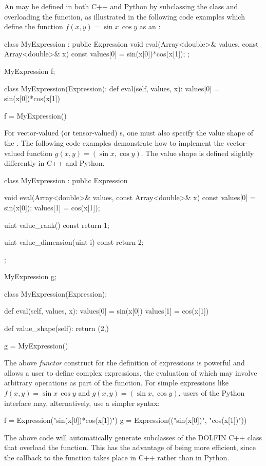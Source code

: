 An  may be defined in both C++ and Python by
subclassing the  class and overloading the 
function, as illustrated in the following code examples which define
the function $f(x, y) = \sin x \, \cos y$ as an :
\begin{c++}
class MyExpression : public Expression
{
  void eval(Array<double>& values, const Array<double>& x) const
  {
    values[0] = sin(x[0])*cos(x[1]);
  }
};

MyExpression f;
\end{c++}
\begin{python}
class MyExpression(Expression):
    def eval(self, values, x):
        values[0] = sin(x[0])*cos(x[1])

f = MyExpression()
\end{python}
For vector-valued (or tensor-valued) s, one must also
specify the value shape of the . The following code
examples demonstrate how to implement the vector-valued function $g(x,
y) = (\sin x, \cos y)$. The value shape is defined slightly
differently in C++ and Python.
\begin{c++}
class MyExpression : public Expression
{
  void eval(Array<double>& values, const Array<double>& x) const
  {
    values[0] = sin(x[0]);
    values[1] = cos(x[1]);
  }

  uint value_rank() const
  {
    return 1;
  }

  uint value_dimension(uint i) const
  {
    return 2;
  }
};

MyExpression g;
\end{c++}
\begin{python}
class MyExpression(Expression):

    def eval(self, values, x):
        values[0] = sin(x[0])
        values[1] = cos(x[1])

    def value_shape(self):
        return (2,)

g = MyExpression()
\end{python}

The above \emph{functor} construct for the definition of expressions
is powerful and allows a user to define complex expressions, the
evaluation of which may involve arbitrary operations as part of the
 function. For simple expressions like $f(x, y) = \sin x \,
\cos y$ and $g(x, y) = (\sin x, \cos y)$, users of the Python
interface may, alternatively, use a simpler syntax:
\begin{python}
f = Expression("sin(x[0])*cos(x[1])")
g = Expression(("sin(x[0])", "cos(x[1])"))
\end{python}
The above code will automatically generate subclasses of the DOLFIN C++
 class that overload the  function. This has the
advantage of being more efficient, since the callback to the 
function takes place in C++ rather than in Python.

